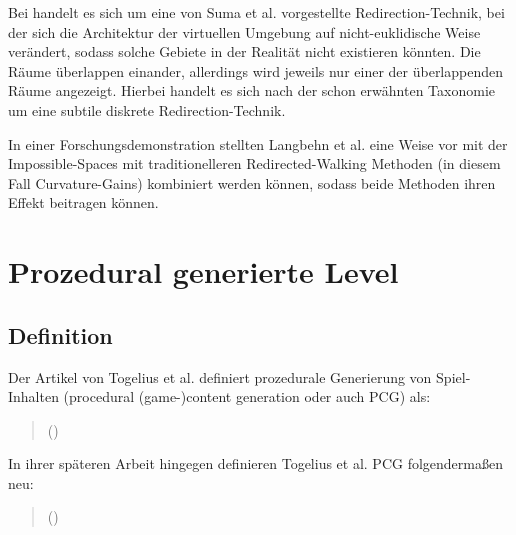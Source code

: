 Bei  handelt es sich um eine von
Suma et al. \cite{impossible-spaces-suma} vorgestellte Redirection-Technik, bei der sich die Architektur der virtuellen Umgebung auf nicht-euklidische Weise verändert, sodass solche Gebiete in der Realität nicht existieren könnten.
Die Räume überlappen einander, allerdings wird jeweils nur einer der überlappenden Räume angezeigt. Hierbei handelt es sich nach der schon erwähnten Taxonomie um eine subtile diskrete Redirection-Technik.

In einer Forschungsdemonstration \cite{redirected-spaces} stellten Langbehn et al. eine Weise vor mit der Impossible-Spaces mit traditionelleren Redirected-Walking Methoden (in diesem Fall Curvature-Gains)
kombiniert werden können, sodass beide Methoden ihren Effekt beitragen können.

\section{Prozedural generierte Level}

\subsection{Definition}

Der Artikel \cite{sbpcg} von Togelius et al. definiert prozedurale Generierung von Spiel-Inhalten (procedural (game-)content generation oder auch PCG) als:

\begin{quotation}
\end{quotation}

\begin{quotation}
    ()
\end{quotation}

In ihrer späteren Arbeit hingegen \cite{what-is-pcg} definieren Togelius et al. PCG folgendermaßen neu:
\begin{quotation}
\end{quotation}

\begin{quotation}
    ()
\end{quotation}


